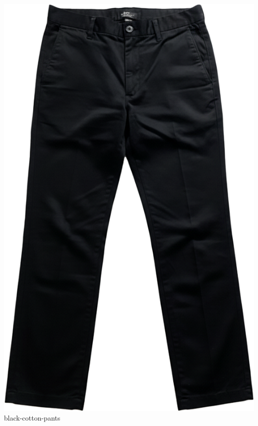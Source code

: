 \documentclass[10pt]{article}
\begin{document}
\begin{minipage}[t]{0.22\textwidth}\centering\vspace{0mm}
\includegraphics[width=\linewidth,keepaspectratio]{assets/pants/black-cotton-pants.png}\\
\vspace{0.5mm}\tiny black-cotton-pants\end{minipage}
\end{document}
